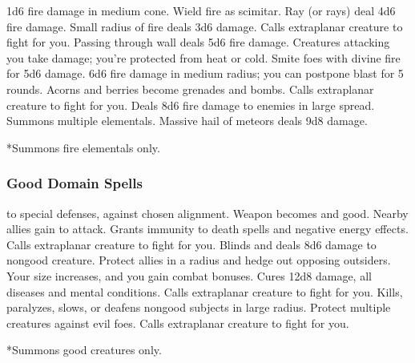 \begin{spelllist}
     1d6 fire damage in medium cone.
    \spellhead[1]{}
     Wield fire as scimitar.
     Ray (or rays) deal 4d6 fire damage.
    \spellhead[3]{}
     Small radius of fire deals 3d6 damage.
     Calls extraplanar creature to fight for you.
     Passing through wall deals 5d6 fire damage.
     Creatures attacking you take damage; you're protected from heat or cold.
     Smite foes with divine fire for 5d6 damage.
     6d6 fire damage in medium radius; you can postpone blast for 5 rounds.
     Acorns and berries become grenades and bombs.
    \spellhead[7]{}
     Calls extraplanar creature to fight for you.
     Deals 8d6 fire damage to enemies in large spread.
     Summons multiple elementals.
     Massive hail of meteors deals 9d8 damage.
\end{spelllist}
*Summons fire elementals only.

\subsubsection{Good Domain Spells}

\begin{spelllist}
    \spellhead[1]{}
      to special defenses,  against chosen alignment.
     Weapon becomes  and good.
     Nearby allies gain  to attack.
     Grants immunity to death spells and negative energy effects.
     Calls extraplanar creature to fight for you.
    \spellhead[4]{}
     Blinds and deals 8d6 damage to nongood creature.
     Protect allies in a \areamed radius and hedge out opposing outsiders.
     Your size increases, and you gain combat bonuses.
     Cures 12d8 damage, all diseases and mental conditions.
     Calls extraplanar creature to fight for you.
    \F Kills, paralyzes, slows, or deafens nongood subjects in large radius.
    \spellhead[7]{}
    \spellhead[8]{}
     Protect multiple creatures against evil foes. 
    \spellhead[9]{}
     Calls extraplanar creature to fight for you.
\end{spelllist}
*Summons good creatures only.

